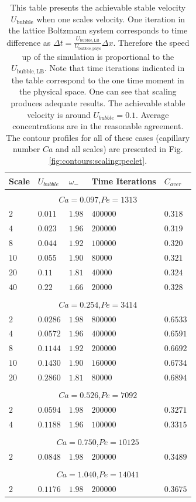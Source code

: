 \documentclass{article}
\newcommand{\ububble}{U_{\mathrm{bubble}}}
\newcommand{\omegaminus}{\omega_{-}}
\begin{document}
\begin{table}[htb!]
\begin{tabularx}{\textwidth}{|X|X|X|X|X|}
\hline
Scale&$U_{bubble}$&$\omegaminus$&Time Iterations&$C_{aver}$\\
\hline
\multicolumn{5}{c}{}\\
\multicolumn{5}{c}{$Ca=0.097$,$Pe=1313$}\\
\hline
$2$ &$0.011$&$1.98$&$400000$&$0.318$\\
$4$ &$0.023$&$1.96$&$200000$&$0.319$\\
$8$ &$0.044$&$1.92$&$100000$&$0.320$\\
$10$&$0.055$&$1.90$&$80000$ &$0.321$\\
$20$&$0.11 $&$1.81$&$40000$ &$0.324$\\
$40$&$0.22 $&$1.66$&$20000$ &$0.328$\\
\hline
\multicolumn{5}{c}{}\\
\multicolumn{5}{c}{$Ca=0.254$,$Pe=3414$}\\
\hline
$2$& $0.0286$&$1.98$&$800000$&$0.6533$\\
$4$& $0.0572$&$1.96$&$400000$&$0.6591$\\
$8$& $0.1144$&$1.92$&$200000$&$0.6692$\\
$10$&$0.1430$&$1.90$&$160000$&$0.6734$\\
$20$&$0.2860$&$1.81$&$80000$ &$0.6894$\\
\hline
\multicolumn{5}{c}{}\\
\multicolumn{5}{c}{$Ca=0.526$,$Pe=7092$}\\
\hline
$2$&$0.0594$&$1.98$&$200000$&$0.3271$\\
$4$&$0.1188$&$1.96$&$100000$&$0.3315$\\
\hline
\multicolumn{5}{c}{}\\
\multicolumn{5}{c}{$Ca=0.750$,$Pe=10125$}\\
\hline
$2$&$0.0848$&$1.98$&$200000$&$0.3489$\\
\hline
\multicolumn{5}{c}{}\\
\multicolumn{5}{c}{$Ca=1.040$,$Pe=14041$}\\
\hline
$2$&$0.1176$&$1.98$&$200000$&$0.3675$\\
\hline
\end{tabularx}
\caption{This table presents the achievable stable velocity $\ububble$ when one scales velocity. One
iteration in the lattice
Boltzmann system corresponds to time difference as
$\Delta t=\frac{U_{\mathrm{bubble,LB}}}{U_{\mathrm{bubble,phys}}} \Delta x$. Therefore the speed up
of the simulation is proportional to the  $U_{\mathrm{bubble,LB}}$. Note that time
iterations
indicated in the table correspond to the one time moment in the physical space. One can see that
scaling produces adequate results.  The achievable stable velocity is around $U_{bubble}=0.1$. Average concentrations are in the reasonable agreement. The contour
profiles for all of these cases (capillary number $Ca$ and all scales) are presented in Fig.
\ref{fig:contours:scaling:peclet}.
\label{table:scaling:peclet}}
\end{table}
\end{document}
